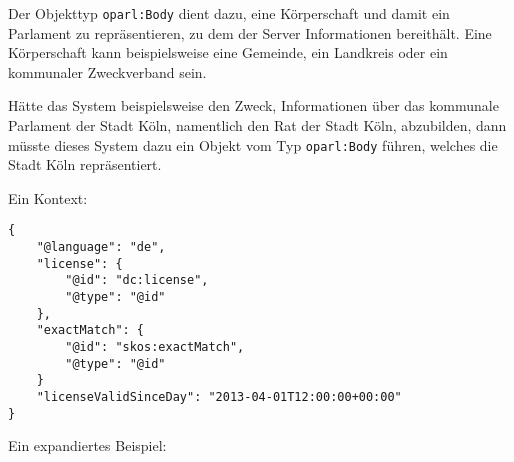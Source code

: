 \documentclass[,a4paper]{article}
\begin{document}
Der Objekttyp \texttt{oparl:Body} dient dazu, eine Körperschaft und
damit ein Parlament zu repräsentieren, zu dem der Server Informationen
bereithält. Eine Körperschaft kann beispielsweise eine Gemeinde, ein
Landkreis oder ein kommunaler Zweckverband sein.

Hätte das System beispielsweise den Zweck, Informationen über das
kommunale Parlament der Stadt Köln, namentlich den Rat der Stadt Köln,
abzubilden, dann müsste dieses System dazu ein Objekt vom Typ
\texttt{oparl:Body} führen, welches die Stadt Köln repräsentiert.

Ein Kontext:

\begin{verbatim}
{
    "@language": "de",
    "license": {
        "@id": "dc:license",
        "@type": "@id"
    },
    "exactMatch": {
        "@id": "skos:exactMatch",
        "@type": "@id"
    }
    "licenseValidSinceDay": "2013-04-01T12:00:00+00:00"
}
\end{verbatim}

Ein expandiertes Beispiel:
\end{document}
